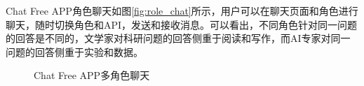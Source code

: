 \documentclass{article}
\begin{document}
Chat Free APP角色聊天如图\ref{fig:role_chat}所示，用户可以在聊天页面和角色进行聊天，随时切换角色和API，发送和接收消息。可以看出，不同角色针对同一问题的回答是不同的，文学家对科研问题的回答侧重于阅读和写作，而AI专家对同一问题的回答侧重于实验和数据。

\newpage
\begin{figure}[h]
    \centering
    \caption{Chat Free APP多角色聊天}
    \label{fig:multi_role_chat}
\end{figure}
\end{document}
